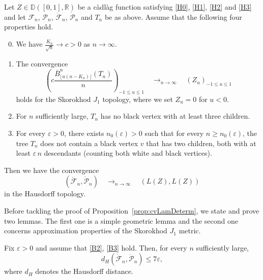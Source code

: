 \documentclass[AHL,XML,longabstracts,Unicode]{cedram}
\newcommand{\R}{\mathbb{R}}
\newcommand{\D}{\mathbb{D}}
\def\eps{\varepsilon}
\def\PPP{\mathcal P}
\def\FFF{\mathcal F}
\def\dFn{\dot{\mathcal{F}}_{n}}
\def\dPn{\dot{\mathcal{P}}_{n}}
\def\oB{\overline{B}}
\renewcommand{\epsilon}{\varepsilon}
\begin{document}
\begin{proposition}
  \label{prop:cvLamDeterm} Let $Z \in {\D}([0, 1], \R)$ be a c\`adl\`ag function satisfying \ref{H0}, \ref{H1}, \ref{H2} and \ref{H3}
  and let $\FFF_{n}$, $\PPP_{n}$, $\dFn$, $\dPn$ and $T_{n}$ be as above.
  Assume that the following four properties hold.
  \begin{enumerate}[label=\color{blue}(B\arabic*)]
  \setcounter{enumi}{-1}
\item\label{B0}  We have $\tfrac{K_n}{\sqrt{n}} \rightarrow c>0$ as $n \rightarrow \infty$.
\item\label{B1} The convergence
\begin{equation}
 \left(  c \frac{\oB^{n}_{\lfloor u (n-K_{n}) \rfloor}(T_n)}{ n} \right)_{-1 \leq u \leq 1}
\quad \mathop{\longrightarrow}_{n \rightarrow \infty} \quad (Z_{u})_{- 1\leq u \leq 1}
\label{eq:cv_HB_Skorokhod}
\end{equation}
holds for the Skorokhod $J_{1}$ topology, where we set $Z_{u}=0$ for $u<0$.
\item\label{B2} For $n$ sufficiently large, $T_n$ has no black vertex  with at least three children.
\item\label{B3} For every $\eps>0$, there exists $n_0(\eps)>0$ such that  for every $n \ge n_0(\eps)$, the tree $T_n$ does not contain a black
  vertex $v$ that has two children, both with at least $\eps \, n$ descendants (counting both white and black vertices).
\end{enumerate}
Then we have the  convergence
\begin{equation}
\left(  \dFn, \dPn   \right)   \quad \mathop{\longrightarrow}_{n \rightarrow \infty} \quad ( L(Z), L(Z))
\label{eq:cv_FP_Skorokhod}
\end{equation}
in the Hausdorff topology.
\end{proposition}



Before tackling the proof of Proposition~\ref{prop:cvLamDeterm}, we state and prove two lemmas. The first one is a simple geometric lemma and the second one concerns approximation properties of the Skorokhod $J_{1}$ metric.

\begin{lemma}
\label{lem:proche}
Fix $\epsilon>0$ and assume that \ref{B2}, \ref{B3} hold. Then, for every $n$ sufficiently large,
\[d_{H}\left( \dFn  , \dPn  \right)  \leq 7\epsilon,\]
where $d_{H}$ denotes the Hausdorff distance.
\end{lemma}
\end{document}

